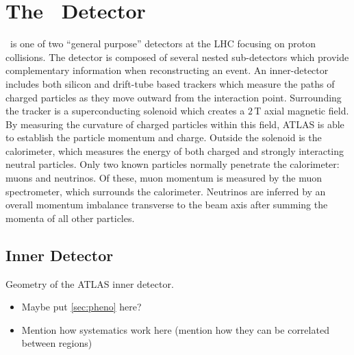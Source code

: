 \section{The \atlas\ Detector}

\atlas\ is one of two ``general purpose'' detectors at the LHC focusing on proton collisions.
The detector is composed of several nested sub-detectors which provide complementary information when reconstructing an event.
An inner-detector includes both silicon and drift-tube based trackers which measure the paths of charged particles as they move outward from the interaction point.
Surrounding the tracker is a superconducting solenoid which creates a $2\,\text{T}$ axial magnetic field.
By measuring the curvature of charged particles within this field, ATLAS is able to establish the particle momentum and charge.
Outside the solenoid is the calorimeter, which measures the energy of both charged and strongly interacting neutral particles.
Only two known particles normally penetrate the calorimeter: muons and neutrinos.
Of these, muon momentum is measured by the muon spectrometer, which surrounds the calorimeter.
Neutrinos are inferred by an overall momentum imbalance transverse to the beam axis after summing the momenta of all other particles.

\subsection{Inner Detector}

\begin{cfig}
  \caption[ATLAS inner detector geometry]{Geometry of the ATLAS inner detector.}
  \label{fig:atlas-id-acceptance}
\end{cfig}


\label{sec:atlas}
\begin{itemize}
\item Maybe put \cref{sec:pheno} here?
\item Mention how systematics work here (mention how they can be correlated between regions)
\end{itemize}
